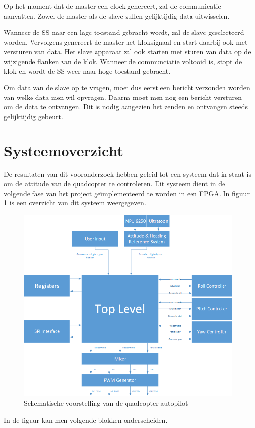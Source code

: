 			\par Op het moment dat de master een clock genereert, zal de communicatie aanvatten. Zowel de master als de slave zullen gelijktijdig data uitwisselen.  

			\par Wanneer de SS naar een lage toestand gebracht wordt, zal de slave geselecteerd worden. Vervolgens genereert de master het kloksignaal en start daarbij ook met versturen van data. Het slave apparaat zal ook starten met sturen van data op de wijzigende flanken van de klok. Wanneer de communciatie voltooid is, stopt de klok en wordt de SS weer naar hoge toestand gebracht.

			\par Om data van de slave op te vragen, moet dus eerst een bericht verzonden worden van welke data men wil opvragen. Daarna moet men nog een bericht versturen om de data te ontvangen. Dit is nodig aangezien het zenden en ontvangen steeds gelijktijdig gebeurt.
\newpage
		\section{Systeemoverzicht}

			\par De resultaten van dit vooronderzoek hebben geleid tot een systeem dat in staat is om de attitude van de quadcopter te controleren. Dit systeem dient in de volgende fase van het project ge\"implementeerd te worden in een FPGA. In figuur \ref{systeemoverzicht} is een overzicht van dit systeem weergegeven.

				\begin{figure}[H]					  
					  \centering
					  \includegraphics[width=\textwidth]{Vooronderzoek/blokschema.png}
					  \caption{Schematische voorstelling van de quadcopter autopilot}
					  \label{systeemoverzicht}
				\end{figure}
\newpage
			\par In de figuur kan men volgende blokken onderscheiden.

